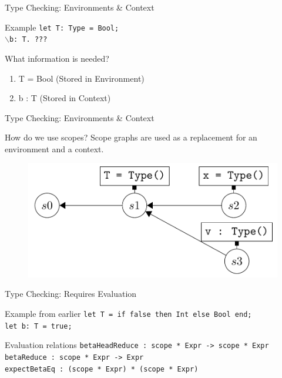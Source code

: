 \documentclass[aspectratio=43]{beamer}
\begin{document}
\begin{frame}[fragile]{Type Checking: Environments \& Context}
	\begin{exampleblock}{Example}
		\texttt{let T: Type = Bool;\\
			$\backslash$b: T. ???
		}
	\end{exampleblock}
	
	\begin{block}{What information is needed?}
		\begin{enumerate}
			\item T = Bool (Stored in Environment)
			\item b : T (Stored in Context)
		\end{enumerate}
	\end{block}
\end{frame}


\begin{frame}[fragile]{Type Checking: Environments \& Context}
	\begin{block}{How do we use scopes?}
		Scope graphs are used as a replacement for an environment and a context.
	\end{block}
	
	\begin{figure}
		\includegraphics[width=0.7\linewidth]{screenshot005}
	\end{figure}
	
\end{frame}

\begin{frame}[fragile]{Type Checking: Requires Evaluation}
	\begin{exampleblock}{Example from earlier}
		\texttt{let T = if false then Int else Bool end;\\let b: T = true;}
	\end{exampleblock}
	\begin{block}{Evaluation relations} 
		\texttt{betaHeadReduce : scope * Expr -> scope * Expr} \\
		\texttt{betaReduce : scope * Expr -> Expr} \\
		\texttt{expectBetaEq : (scope * Expr) * (scope * Expr)}
	\end{block}

\end{frame}
\end{document}
